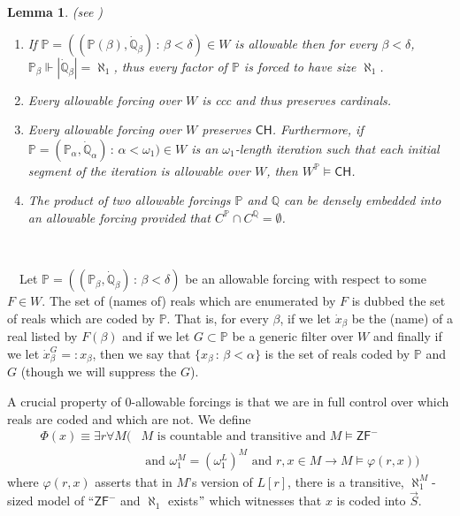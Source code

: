 \documentclass[a4paper,11pt]{article}
\newtheorem{lemma}[theorem]{Lemma}
\newcommand{\forceP}{\mathbb{P}}
\newcommand{\forceQ}{\mathbb{Q}}
\newcommand{\ZFP}{\mathsf{ZF}^-}
\newcommand{\CH}{\mathsf{CH}}
\begin{document}
     \begin{lemma}(see \cite{Separation without reduction})
    ﻿
    ﻿
    ﻿
    \begin{enumerate}
    ﻿
    \item If $\forceP=((\forceP(\beta), \dot{\forceQ}_{\beta}) \, : \, \beta < \delta) \in W$ is allowable then for every $\beta < \delta$, $\forceP_{\beta} \Vdash| \dot{\forceQ}_{\beta}|= \aleph_1$, thus every factor of $\forceP$ is forced to have size $\aleph_1$.
    ﻿
    \item Every allowable forcing over $W$ is ccc and thus preserves cardinals.
    ﻿
    \item Every allowable forcing over $W$ preserves $\CH$. Furthermore, if $\forceP= (\forceP_{\alpha},\dot{\forceQ}_{\alpha}) \, : \, \alpha < \omega_1) \in W$ is an $\omega_1$-length iteration such that each initial segment of the iteration is allowable over $W$, then $W^{\forceP} \models \CH$.
    ﻿
    \item The product of two allowable forcings $\forceP$ and $\forceQ$ can be densely embedded into an allowable forcing provided that $C^{\forceP} \cap C^{\forceQ}=\emptyset$.
    ﻿
    \end{enumerate}
    ﻿
    \end{lemma}
    ﻿
    ﻿
    ﻿
    Let $\forceP= ((\forceP_{\beta}, \dot{\forceQ}_{\beta}) \, : \, \beta < \delta)$ be an allowable forcing with respect to some $F \in W$.
    The set of  (names of) reals which are enumerated by $F$ is dubbed the set of reals which are coded by $\forceP$. That is, for every $\beta$, if we let $\dot{x}_{\beta}$ be the (name) of a real  listed by $F(\beta)$ and if we let $G \subset \forceP$ be a generic filter over $W$ and finally if we let
    $ \dot{x}_{\beta}^G =:x_{\beta}$,  then we say that
    $\{ x_{\beta} \, : \, \beta < \alpha \}$ is the set of reals coded by $\forceP$ and $G$ (though we will suppress the $G$).

   
   A crucial property of 0-allowable forcings is that we are in full control over which reals are coded and which are not. We define
    \begin{align*}
    \Phi (x) \equiv \exists r  \forall M (&M \text{ is countable and transitive and } M \models \ZFP \\&\text{ and } \omega_1^M=(\omega_1^L)^M \text{ and }  r, x \in M  \rightarrow M \models \varphi(r,x ))
    \end{align*}
    where $\varphi(r,x)$ asserts that in $M$'s version of $L[r]$, there is a transitive, $\aleph_1^M$-sized  model of ``$\ZFP$ and $\aleph_1$ exists$"$ which witnesses that $x$ is coded into $\vec{S}$. 
\end{document}
